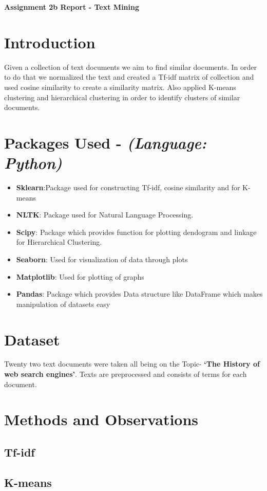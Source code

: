 \documentclass[7pt,a4paper]{article}
\begin{document}
\textbf{\LARGE Assignment 2b Report - Text Mining}
\section{Introduction}
Given a collection of text documents we aim to find similar documents. In order to do that we normalized the text and created a Tf-idf matrix of collection and used cosine similarity to create a similarity matrix. Also applied K-means clustering and hierarchical clustering in order to identify clusters of similar documents.

\section{Packages Used - \textit{(Language: Python)}}
\begin{itemize}
\item{\textbf{Sklearn}:Package used for constructing Tf-idf, cosine similarity and for K-means}
\item{\textbf{NLTK}: Package used for Natural Language Processing.}
\item{\textbf{Scipy}: Package which provides function for plotting dendogram and linkage for Hierarchical Clustering.}
\item{\textbf{Seaborn}: Used for visualization of data through plots}
\item{\textbf{Matplotlib}: Used for plotting of graphs}
\item{\textbf{Pandas}: Package which provides Data structure like DataFrame which makes
manipulation of datasets easy}
\end{itemize}

\section{Dataset}
Twenty two text documents were taken all being on the Topic- \textbf{‘The History of web search engines’}. Texts are preprocessed and consists of terms for each document. 

\section{Methods and Observations}

\subsection{Tf-idf}

\subsection{K-means}
\end{document}
